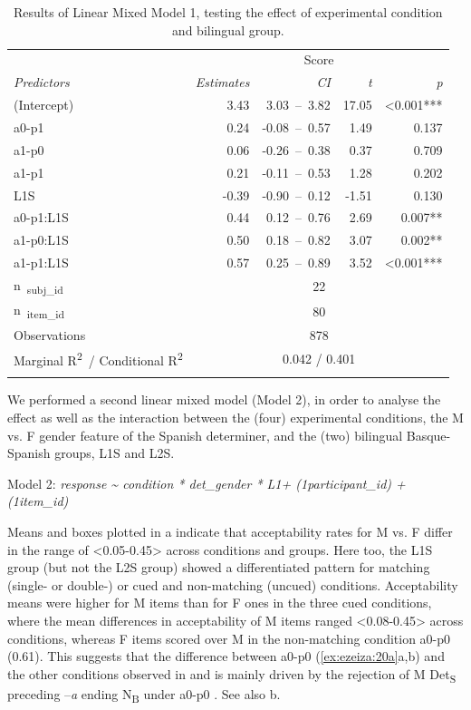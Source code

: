 \documentclass[output=paper]{langscibook}
\begin{document}
\begin{table}
\begin{tabularx}{\textwidth}{Xrrrr}
\lsptoprule
  & \multicolumn{4}{c}{{ Score}}\\
{ \textit{Predictors}} & { \textit{Estimates}} & { \textit{CI}} & { \textit{t}} & { \textit{p}}\\
\midrule
{ (Intercept)} & { 3.43} & { 3.03~–~3.82} & { 17.05} & { <0.001***}\\
{ a0-p1} & { 0.24} & { {}-0.08~–~0.57} & { 1.49} & { 0.137}\\
{ a1-p0} & { 0.06} & { {}-0.26~–~0.38} & { 0.37} & { 0.709}\\
{ a1-p1} & { 0.21} & { {}-0.11~–~0.53} & { 1.28} & { 0.202}\\
{ L1S}  & { {}-0.39} & { {}-0.90~–~0.12} & { {}-1.51} & { 0.130}\\
{ a0-p1:L1S} & { 0.44} & { 0.12~–~0.76} & { 2.69} & { 0.007**}\\
{ a1-p0:L1S} & { 0.50} & { 0.18~–~0.82} & { 3.07} & { 0.002**}\\
{ a1-p1:L1S} & { 0.57} & { 0.25~–~0.89} & { 3.52} & { <0.001***}\\
{ n~\textsubscript{subj\_id}} & \multicolumn{4}{c}{{ 22}}\\
{ n~\textsubscript{item\_id}} & \multicolumn{4}{c}{{ 80}}\\
{ Observations} & \multicolumn{4}{c}{{ 878}}\\
{ Marginal R\textsuperscript{2}~/ Conditional R\textsuperscript{2}} & \multicolumn{4}{c}{{ 0.042 / 0.401}}\\
\lspbottomrule
\end{tabularx}
\caption{Results of Linear Mixed Model 1, testing the effect of experimental condition and bilingual group.}
\label{tab:ezeiza:5}
\end{table}

{We performed a second linear mixed model (Model 2), in order to analyse the effect as well as the interaction between the (four) experimental conditions, the M vs. F gender feature of the Spanish determiner, and the (two) bilingual Basque-Spanish groups, L1S  and L2S.}

Model 2: \textit{response {\textasciitilde} condition * det\_gender * L1+ (1{\textbar}participant\_id) + (1{\textbar}item\_id)}

Means and boxes plotted in a indicate that acceptability rates for M vs. F differ in the range of <0.05-0.45> across conditions and groups. Here too, the L1S group (but not the L2S group) showed a differentiated pattern for matching (single- or double-) or cued and non-matching (uncued) conditions. Acceptability means were higher for M items than for F ones in the three cued conditions, where the mean differences in acceptability of M items ranged <0.08-0.45> across conditions, whereas F items scored over M in the non-matching condition a0-p0 (0.61). This suggests that the difference between a0-p0 (\ref{ex:ezeiza:20a}a,b) and the other conditions observed in  and  is mainly driven by the rejection of M Det\textsubscript{S} preceding –\textit{a} ending N\textsubscript{B} under a0-p0 . See also b.
\end{document}
